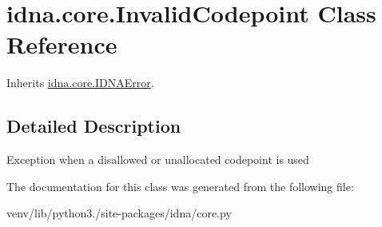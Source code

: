 \hypertarget{classidna_1_1core_1_1_invalid_codepoint}{}\section{idna.\+core.\+Invalid\+Codepoint Class Reference}
\label{classidna_1_1core_1_1_invalid_codepoint}


Inherits \hyperlink{classidna_1_1core_1_1_i_d_n_a_error}{idna.\+core.\+I\+D\+N\+A\+Error}.



\subsection{Detailed Description}
\begin{DoxyVerb}Exception when a disallowed or unallocated codepoint is used \end{DoxyVerb}
 

The documentation for this class was generated from the following file\+:\begin{DoxyCompactItemize}
\item 
venv/lib/python3./site-\/packages/idna/core.\+py\end{DoxyCompactItemize}
